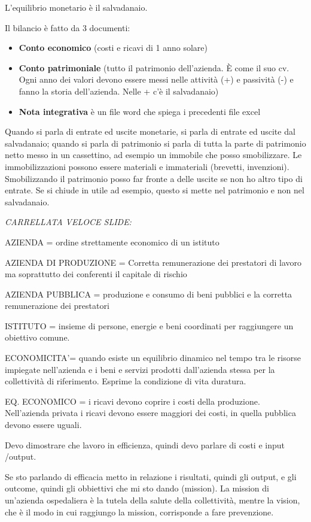 L'equilibrio monetario è il salvadanaio.

Il bilancio è fatto da 3 documenti:

\begin{itemize}
\item
  \textbf{Conto economico} (costi e ricavi di 1 anno solare)
\item
  \textbf{Conto patrimoniale} (tutto il patrimonio dell'azienda. È come il suo cv. Ogni anno dei valori devono essere messi nelle attività (+) e passività (-) e fanno la storia dell'azienda. Nelle + c'è il salvadanaio)
\item
  \textbf{Nota integrativa} è un file word che spiega i precedenti file excel
\end{itemize}

Quando si parla di entrate ed uscite monetarie, si parla di entrate ed uscite dal salvadanaio; quando si parla di patrimonio si parla di tutta la parte di patrimonio netto messo in un cassettino, ad esempio un immobile che posso smobilizzare. Le immobilizzazioni possono essere materiali e immateriali (brevetti, invenzioni). Smobilizzando il patrimonio posso far fronte a delle uscite se non ho altro tipo di entrate. Se si chiude in utile ad esempio, questo si mette nel patrimonio e non nel salvadanaio.

\emph{CARRELLATA VELOCE SLIDE:}

AZIENDA = ordine strettamente economico di un istituto

AZIENDA DI PRODUZIONE = Corretta remunerazione dei prestatori di lavoro ma soprattutto dei conferenti il capitale di rischio

AZIENDA PUBBLICA = produzione e consumo di beni pubblici e la corretta remunerazione dei prestatori

ISTITUTO = insieme di persone, energie e beni coordinati per raggiungere
un obiettivo comune.

ECONOMICITA'= quando esiste un equilibrio dinamico nel tempo tra le risorse impiegate nell'azienda e i beni e servizi prodotti dall'azienda stessa per la collettività di riferimento. Esprime la condizione di vita duratura.

EQ. ECONOMICO = i ricavi devono coprire i costi della produzione. Nell'azienda privata i ricavi devono essere maggiori dei costi, in quella pubblica devono essere uguali.

Devo dimostrare che lavoro in efficienza, quindi devo parlare di costi e input /output.

Se sto parlando di efficacia metto in relazione i risultati, quindi gli output, e gli outcome, quindi gli obbiettivi che mi sto dando (mission).
La mission di un'azienda ospedaliera è la tutela della salute della collettività, mentre la vision, che è il modo in cui raggiungo la mission, corrisponde a fare prevenzione.


